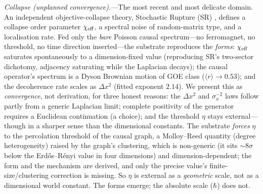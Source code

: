 \documentclass[aps,prl,reprint,nofootinbib,superscriptaddress,floatfix]{revtex4-2}
\begin{document}
\emph{Collapse (unplanned convergence).}---The most recent and most delicate domain. An
independent objective-collapse theory, Stochastic Rupture (SR) \cite{ZambuziSR2026},
defines a collapse order parameter $\chi_{\rm eff}$, a spectral noise of random-matrix
type, and a localisation rate. Fed only the \emph{bare} Poisson causal spectrum---no
ferromagnet, no threshold, no time direction inserted---the substrate reproduces the
\emph{forms}: $\chi_{\rm eff}$ saturates spontaneously to a dimension-fixed value
(reproducing SR's two-sector dichotomy, adjacency saturating while the Laplacian decays);
the causal operator's spectrum is a Dyson Brownian motion of GOE class
($\langle r\rangle\to0.53$); and the decoherence rate scales as $\Delta x^{2}$ (fitted
exponent $2.14$). We present this as \emph{convergence}, not derivation, for three honest
reasons: the $\Delta x^2$ and $\sigma_x^{-2}$ laws follow partly from a generic Laplacian
limit; complete positivity of the generator requires a Euclidean continuation (a choice);
and the threshold $\eta$ stays external---though in a sharper sense than the dimensional
constants. The substrate \emph{forces} $\eta$ to the percolation threshold of the causal
graph, a Molloy--Reed quantity (degree heterogeneity) raised by the graph's clustering,
which is non-generic (it sits $\sim8\sigma$ below the Erd\H{o}s--R\'enyi value in four
dimensions) and dimension-dependent; the form and the mechanism are derived, and only the
precise value's finite-size/clustering correction is missing. So $\eta$ is external as a
\emph{geometric} scale, not as a dimensional world constant. The forms emerge; the absolute
scale ($\hbar$) does not.
\end{document}
